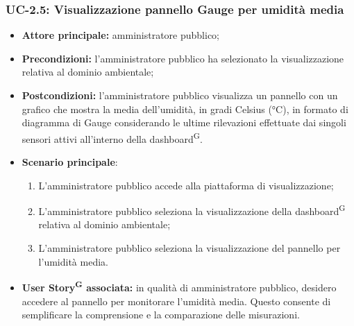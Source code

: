 \documentclass[8pt]{article}
\newcommand{\glossterm}[1]{#1\textsuperscript{G}} %
\begin{document}
\subsubsection*{UC-2.5: Visualizzazione pannello Gauge per umidità media}
\begin{itemize}
    \item \textbf{Attore principale:} amministratore pubblico;
    \item \textbf{Precondizioni: }l'amministratore pubblico ha selezionato la visualizzazione
        relativa al dominio ambientale;
    \item \textbf{Postcondizioni:} l'amministratore pubblico visualizza un pannello con un grafico che mostra la media dell'umidità, in gradi Celsius (°C), in formato di diagramma di Gauge considerando le ultime rilevazioni effettuate dai singoli sensori attivi all'interno della \glossterm{dashboard}.
    \item \textbf{Scenario principale}:
    \begin{enumerate}
    \item L’amministratore pubblico accede alla piattaforma di visualizzazione;
    \item L’amministratore pubblico seleziona la visualizzazione della \glossterm{dashboard} relativa al dominio
        ambientale; 
    \item L’amministratore pubblico seleziona la visualizzazione del pannello per l'umidità media.
    \end{enumerate}
\item \textbf{\glossterm{User Story} associata:} in qualità di amministratore pubblico, desidero accedere al pannello per monitorare l'umidità media. Questo consente di semplificare la comprensione e la comparazione delle misurazioni.
\end{itemize}
\end{document}
